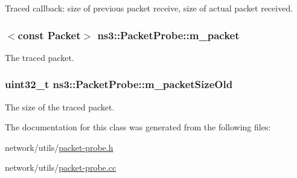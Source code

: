Traced callback\+: size of previous packet receive, size of actual packet received. 

\subsubsection[{\texorpdfstring{m\+\_\+packet}{m_packet}}]{$<$const {\bf Packet}$>$ ns3\+::\+Packet\+Probe\+::m\+\_\+packet\hspace{0.3cm}{\ttfamily [private]}}\hypertarget{classns3_1_1PacketProbe_af6ad2ec589eda870946880a0dc515d35}{}\label{classns3_1_1PacketProbe_af6ad2ec589eda870946880a0dc515d35}


The traced packet. 

\subsubsection[{\texorpdfstring{m\+\_\+packet\+Size\+Old}{m_packetSizeOld}}]{\setlength{\rightskip}{0pt plus 5cm}uint32\+\_\+t ns3\+::\+Packet\+Probe\+::m\+\_\+packet\+Size\+Old\hspace{0.3cm}{\ttfamily [private]}}\hypertarget{classns3_1_1PacketProbe_aba078a2a5cf2e954de40d29e851ff037}{}\label{classns3_1_1PacketProbe_aba078a2a5cf2e954de40d29e851ff037}


The size of the traced packet. 



The documentation for this class was generated from the following files\+:\begin{DoxyCompactItemize}
\item 
network/utils/\hyperlink{packet-probe_8h}{packet-\/probe.\+h}\item 
network/utils/\hyperlink{packet-probe_8cc}{packet-\/probe.\+cc}\end{DoxyCompactItemize}
